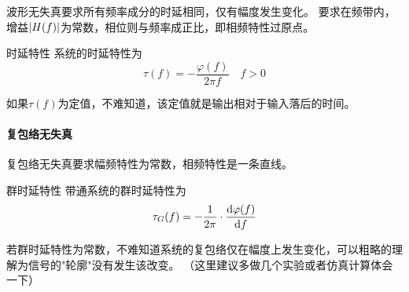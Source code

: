     波形无失真要求所有频率成分的时延相同，仅有幅度发生变化。
    要求在频带内，增益$\left\vert H(f) \right\vert$为常数，相位则与频率成正比，即相频特性过原点。
    \begin{mydef}{时延特性}
        系统的时延特性为
        \begin{equation}
            \tau(f)=-\frac{\varphi(f)}{2\pi f}\hspace{1em}f>0
        \end{equation}
    \end{mydef}
    如果$\tau(f)$为定值，不难知道，该定值就是输出相对于输入落后的时间。

    \paragraph{复包络无失真}\mbox{}

    复包络无失真要求幅频特性为常数，相频特性是一条直线。
    \begin{mydef}{群时延特性}
        带通系统的群时延特性为
        \begin{equation}
            \tau_G(f)=-\frac{1}{2\pi}\cdot\frac{\text{\upshape d}\varphi(f)}{\text{\upshape d} f}
        \end{equation}
    \end{mydef}
    
    若群时延特性为常数，不难知道系统的复包络仅在幅度上发生变化，可以粗略的理解为信号的"轮廓"没有发生该改变。
    （这里建议多做几个实验或者仿真计算体会一下）

